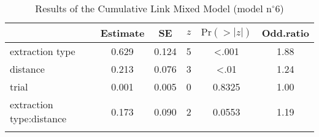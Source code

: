\begin{table}
\begin{tabular}{l S[table-format=1.3] S[table-format=1.3] S[table-format=1] S[table-format=<1.4] S[table-format=2.2]}
  \lsptoprule
 & {Estimate} & {SE} & {$z$} & {$\text{Pr}(>|z|)$} & {Odd.ratio} \\ 
  \midrule
  extraction type          & 0.629 & 0.124 & 5 & <.001  & 1.88 \\ 
  distance                 & 0.213 & 0.076 & 3 & <.01   & 1.24 \\ 
  trial                    & 0.001 & 0.005 & 0 & 0.8325 & 1.00 \\ 
  extraction type:distance & 0.173 & 0.090 & 2 & 0.0553 & 1.19 \\ 
   \lspbottomrule
\end{tabular}
\caption{Results of the Cumulative Link Mixed Model (model n$^{\circ}$6)}
\label{tab:exp1-m6}
\end{table}
